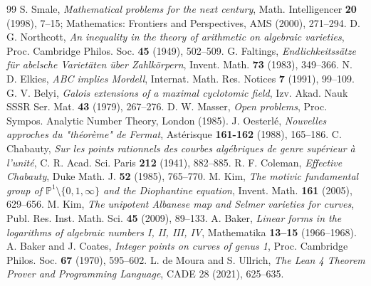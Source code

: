 \documentclass[11pt,a4paper]{article}
\theoremstyle{definition}
\begin{document}
\begin{thebibliography}{99}
 S. Smale, \textit{Mathematical problems for the next century}, Math. Intelligencer \textbf{20} (1998), 7--15; Mathematics: Frontiers and Perspectives, AMS (2000), 271--294.
 D. G. Northcott, \textit{An inequality in the theory of arithmetic on algebraic varieties}, Proc. Cambridge Philos. Soc. \textbf{45} (1949), 502--509.
 G. Faltings, \textit{Endlichkeitssätze für abelsche Varietäten über Zahlkörpern}, Invent. Math. \textbf{73} (1983), 349--366.
 N. D. Elkies, \textit{ABC implies Mordell}, Internat. Math. Res. Notices \textbf{7} (1991), 99--109.
 G. V. Belyi, \textit{Galois extensions of a maximal cyclotomic field}, Izv. Akad. Nauk SSSR Ser. Mat. \textbf{43} (1979), 267--276.
 D. W. Masser, \textit{Open problems}, Proc. Sympos. Analytic Number Theory, London (1985).
 J. Oesterlé, \textit{Nouvelles approches du "théorème" de Fermat}, Astérisque \textbf{161-162} (1988), 165--186.
 C. Chabauty, \textit{Sur les points rationnels des courbes algébriques de genre supérieur à l'unité}, C. R. Acad. Sci. Paris \textbf{212} (1941), 882--885.
 R. F. Coleman, \textit{Effective Chabauty}, Duke Math. J. \textbf{52} (1985), 765--770.
 M. Kim, \textit{The motivic fundamental group of $\mathbb{P}^1 \setminus \{0, 1, \infty\}$ and the Diophantine equation}, Invent. Math. \textbf{161} (2005), 629--656.
 M. Kim, \textit{The unipotent Albanese map and Selmer varieties for curves}, Publ. Res. Inst. Math. Sci. \textbf{45} (2009), 89--133.
 A. Baker, \textit{Linear forms in the logarithms of algebraic numbers I, II, III, IV}, Mathematika \textbf{13--15} (1966--1968).
 A. Baker and J. Coates, \textit{Integer points on curves of genus 1}, Proc. Cambridge Philos. Soc. \textbf{67} (1970), 595--602.
 L. de Moura and S. Ullrich, \textit{The Lean 4 Theorem Prover and Programming Language}, CADE 28 (2021), 625--635.
\end{thebibliography}
\end{document}
